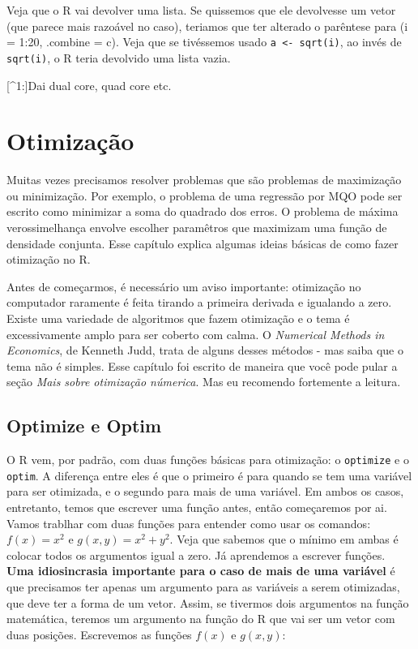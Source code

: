 \documentclass[]{book}
\begin{document}
Veja que o R vai devolver uma lista. Se quissemos que ele devolvesse um
vetor (que parece mais razoável no caso), teriamos que ter alterado o
parêntese para (i = 1:20, .combine = c). Veja que se tivéssemos usado
\texttt{a\ \textless{}-\ sqrt(i)}, ao invés de \texttt{sqrt(i)}, o R
teria devolvido uma lista vazia.

{[}\^{}1:{]}Dai dual core, quad core etc.

\chapter{Otimização}\label{otimizacao}

Muitas vezes precisamos resolver problemas que são problemas de
maximização ou minimização. Por exemplo, o problema de uma regressão por
MQO pode ser escrito como minimizar a soma do quadrado dos erros. O
problema de máxima verossimelhança envolve escolher paramêtros que
maximizam uma função de densidade conjunta. Esse capítulo explica
algumas ideias básicas de como fazer otimização no R.

Antes de começarmos, é necessário um aviso importante: otimização no
computador raramente é feita tirando a primeira derivada e igualando a
zero. Existe uma variedade de algoritmos que fazem otimização e o tema é
excessivamente amplo para ser coberto com calma. O \emph{Numerical
Methods in Economics}, de Kenneth Judd, trata de alguns desses métodos -
mas saiba que o tema não é simples. Esse capítulo foi escrito de maneira
que você pode pular a seção \emph{Mais sobre otimização númerica}. Mas
eu recomendo fortemente a leitura.

\section{Optimize e Optim}\label{optimize-e-optim}

O R vem, por padrão, com duas funções básicas para otimização: o
\texttt{optimize} e o \texttt{optim}. A diferença entre eles é que o
primeiro é para quando se tem uma variável para ser otimizada, e o
segundo para mais de uma variável. Em ambos os casos, entretanto, temos
que escrever uma função antes, então começaremos por ai. Vamos trablhar
com duas funções para entender como usar os comandos: \(f(x)=x^2\) e
\(g(x,y)=x^2+y^2\). Veja que sabemos que o mínimo em ambas é colocar
todos os argumentos igual a zero. Já aprendemos a escrever funções.
\textbf{Uma idiosincrasia importante para o caso de mais de uma
variável} é que precisamos ter apenas um argumento para as variáveis a
serem otimizadas, que deve ter a forma de um vetor. Assim, se tivermos
dois argumentos na função matemática, teremos um argumento na função do
R que vai ser um vetor com duas posições. Escrevemos as funções \(f(x)\)
e \(g(x,y)\):
\end{document}
